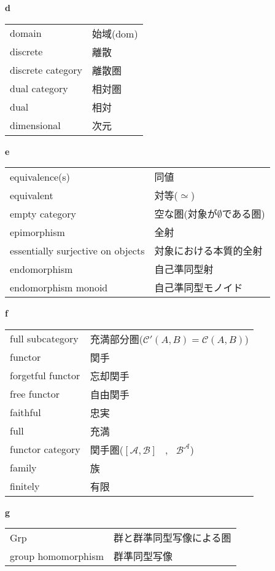 \documentclass[dvipdfmx]{jsarticle}
\begin{document}
\textbf{d}

  \begin{tabular}{ll}
    domain & 始域($\mathrm{dom}$) \\
    discrete & 離散 \\
    discrete category & 離散圏 \\
    dual category & 相対圏 \\
    dual & 相対 \\
    dimensional & 次元 \\
  \end{tabular}

\textbf{e}

  \begin{tabular}{ll}
    equivalence(s) & 同値 \\
    equivalent & 対等($\simeq$) \\
    empty category & 空な圏(対象が$\emptyset$である圏) \\
    epimorphism & 全射 \\
    essentially surjective on objects & 対象における本質的全射 \\
    endomorphism & 自己準同型射 \\
    endomorphism monoid & 自己準同型モノイド \\
  \end{tabular}

\textbf{f}

  \begin{tabular}{ll}
    full subcategory & 充満部分圏($\mathscr{C}'(A,B) = \mathscr{C}(A,B)$) \\
    functor & 関手 \\
    forgetful functor & 忘却関手 \\
    free functor & 自由関手 \\
    faithful & 忠実 \\
    full & 充満 \\
    functor category & 関手圏($[\mathscr{A},\mathscr{B}]$ \, , \, $\mathscr{B^{\mathscr{A}}}$) \\
    family & 族 \\
    finitely & 有限 \\
  \end{tabular}

\textbf{g}

  \begin{tabular}{ll}
    Grp & 群と群準同型写像による圏 \\
    group homomorphism & 群準同型写像 \\
  \end{tabular}
\end{document}
